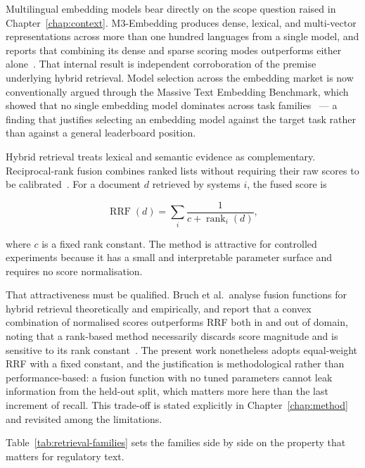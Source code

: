 Multilingual embedding models bear directly on the scope question raised in Chapter~\ref{chap:context}. M3-Embedding produces dense, lexical, and multi-vector representations across more than one hundred languages from a single model, and reports that combining its dense and sparse scoring modes outperforms either alone~\cite{chen2024m3embedding}. That internal result is independent corroboration of the premise underlying hybrid retrieval. Model selection across the embedding market is now conventionally argued through the Massive Text Embedding Benchmark, which showed that no single embedding model dominates across task families~\cite{muennighoff2023mteb} --- a finding that justifies selecting an embedding model against the target task rather than against a general leaderboard position.

Hybrid retrieval treats lexical and semantic evidence as complementary. Reciprocal-rank fusion combines ranked lists without requiring their raw scores to be calibrated~\cite{cormack2009rrf}. For a document $d$ retrieved by systems $i$, the fused score is

\begin{equation}
  \operatorname{RRF}(d) = \sum_i \frac{1}{c + \operatorname{rank}_i(d)},
  \label{eq:rrf}
\end{equation}

where $c$ is a fixed rank constant. The method is attractive for controlled experiments because it has a small and interpretable parameter surface and requires no score normalisation.

That attractiveness must be qualified. Bruch et al.\ analyse fusion functions for hybrid retrieval theoretically and empirically, and report that a convex combination of normalised scores outperforms \ac{RRF} both in and out of domain, noting that a rank-based method necessarily discards score magnitude and is sensitive to its rank constant~\cite{bruch2024fusion}. The present work nonetheless adopts equal-weight \ac{RRF} with a fixed constant, and the justification is methodological rather than performance-based: a fusion function with no tuned parameters cannot leak information from the held-out split, which matters more here than the last increment of recall. This trade-off is stated explicitly in Chapter~\ref{chap:method} and revisited among the limitations.

Table~\ref{tab:retrieval-families} sets the families side by side on the property that matters for regulatory text.


